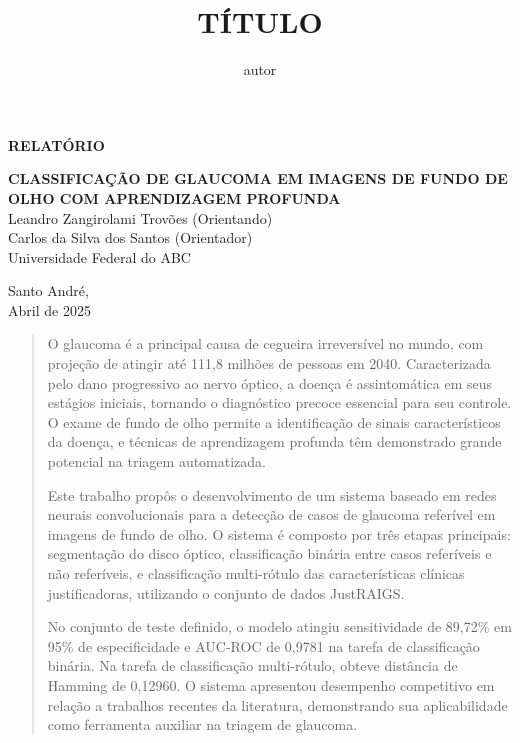 \documentclass[12pt]{article}
\title{TÍTULO}
\author{autor}
\begin{document}
\thispagestyle{empty}
\begin{flushright}
    \begin{huge}
     \textbf{RELATÓRIO}\\[3,5cm]
    \end{huge}
    {\bf \LARGE  CLASSIFICAÇÃO DE GLAUCOMA EM IMAGENS DE FUNDO DE OLHO COM APRENDIZAGEM PROFUNDA}\\
    \bigskip 
    Leandro Zangirolami Trovões (Orientando)\\
    Carlos da Silva dos Santos (Orientador)\\
    Universidade Federal do ABC\\[5,5cm]
\end{flushright}
\vfill
\begin{center}
    Santo André,\\
    Abril de 2025
\end{center}
\newpage


\begin{center}
\end{center}

\begin{quote}
O glaucoma é a principal causa de cegueira irreversível no mundo, com projeção de atingir até 111,8 milhões de pessoas em 2040. Caracterizada pelo dano progressivo ao nervo óptico, a doença é assintomática em seus estágios iniciais, tornando o diagnóstico precoce essencial para seu controle. O exame de fundo de olho permite a identificação de sinais característicos da doença, e técnicas de aprendizagem profunda têm demonstrado grande potencial na triagem automatizada.

Este trabalho propôs o desenvolvimento de um sistema baseado em redes neurais convolucionais para a detecção de casos de glaucoma referível em imagens de fundo de olho. O sistema é composto por três etapas principais: segmentação do disco óptico, classificação binária entre casos referíveis e não referíveis, e classificação multi-rótulo das características clínicas justificadoras, utilizando o conjunto de dados JustRAIGS.

No conjunto de teste definido, o modelo atingiu sensitividade de 89,72\% em 95\% de especificidade e AUC-ROC de 0,9781 na tarefa de classificação binária. Na tarefa de classificação multi-rótulo, obteve distância de Hamming de 0,12960. O sistema apresentou desempenho competitivo em relação a trabalhos recentes da literatura, demonstrando sua aplicabilidade como ferramenta auxiliar na triagem de glaucoma.
\end{quote}
\end{document}
